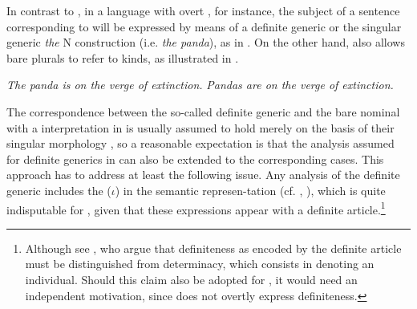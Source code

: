 \documentclass[output=paper
,modfonts
,nonflat]{langsci/langscibook}
\begin{document}
	In contrast to , in a language with overt ,  for instance, the subject of a sentence corresponding to  will be expressed by means of a definite generic \citep{Carlson1977} or the singular generic \citep{Chierchia1998} \textit{the} N construction (i.e. \textit{the panda}), as in . On the other hand,  also allows bare plurals to refer to kinds, as illustrated in .
	
	\ea\label{ex:borik:2}
	\ea\label{ex:borik:2a}
	\textit{The panda is on the verge of extinction.}
	\ex\label{ex:borik:2b}
	\textit{Pandas are on the verge of extinction.}
	\z
	\z
	
	The correspondence between the so-called  definite generic and the  bare nominal with a  interpretation in  is usually assumed to hold merely on the basis of their singular  morphology \citep[cf.][]{Dayal2004}, so a reasonable expectation is that the analysis assumed for definite generics in  can also be extended to the corresponding  cases. This approach has to address at least the following issue. Any analysis of the  definite generic includes the  ($\iota$) in the semantic represen\hyp{}\linebreak\newpage\noindent tation (cf. \citealt{Chierchia1998}, \citealt{Dayal2004}), which is quite indisputable for , given that these expressions appear with a definite article.\footnote{Although see \citet{CoppockBeaver2015}, who argue that definiteness as encoded by the definite article must be distinguished from determinacy, which consists in denoting an individual. Should this claim also be adopted for , it would need an independent motivation, since  does not overtly express definiteness.}
	
\end{document}
